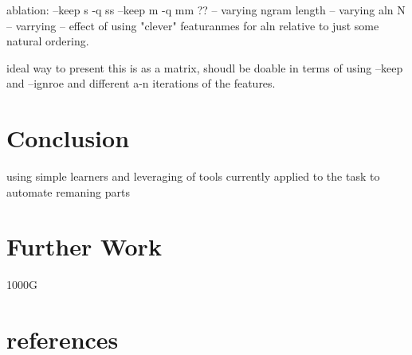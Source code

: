 \documentclass{article}
\begin{document}
ablation:
--keep s -q ss
--keep m -q mm
??
-- varying ngram length
-- varying aln N
-- varrying 
-- effect of using "clever" featuranmes for aln relative to just some natural ordering.

ideal way to present this is as a matrix, shoudl be doable in terms of using --keep and --ignroe and different a-n iterations of the features.

\section{Conclusion}

using simple learners and leveraging of tools currently applied to the task to automate remaning parts


\section{Further Work}
1000G

\section{references}
\end{document}

